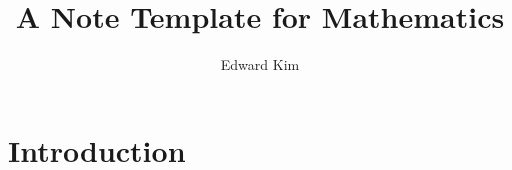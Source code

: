 \documentclass{tufte-book}
\title{A Note Template for Mathematics}
\author{Edward Kim}
\begin{document}
\maketitle

\section{Introduction}
\end{document}
